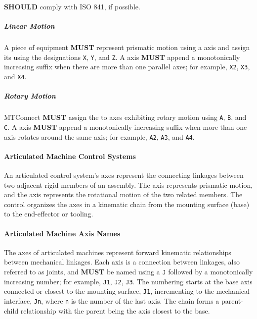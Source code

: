   \textbf{SHOULD} comply with ISO 841, if possible.

\subparagraph{Linear Motion}\mbox{}
\label{sec:Linear Motion}

A piece of equipment \textbf{MUST} represent prismatic motion using a  axis  and assign its  using the designations \texttt{X}, \texttt{Y}, and \texttt{Z}. A  axis  \textbf{MUST} append a monotonically increasing suffix when there are more than one parallel axes; for example, \texttt{X2}, \texttt{X3}, and \texttt{X4}. 

\subparagraph{Rotary Motion}\mbox{}
\label{sec:Rotary Motion}

\gls{MTConnect} \textbf{MUST} assign the  to  axes exhibiting rotary motion using \texttt{A}, \texttt{B}, and \texttt{C}. A  axis  \textbf{MUST} append a monotonically increasing suffix when more than one  axis rotates around the same  axis; for example, \texttt{A2}, \texttt{A3}, and \texttt{A4}. 

\paragraph{Articulated Machine Control Systems}\mbox{}
\label{sec:Articulated Machine Control Systems}

An articulated control system's axes represent the connecting linkages between two adjacent rigid members of an assembly. The  axis represents prismatic motion, and the  axis represents the rotational motion of the two related members. The control organizes the axes in a kinematic chain from the mounting surface (base) to the end-effector or tooling.

\paragraph{Articulated Machine Axis Names}\mbox{}
\label{sec:Articulated Machine Axis Names}

The axes of articulated machines represent forward kinematic relationships between mechanical linkages. Each axis is a connection between linkages, also referred to as joints, and \textbf{MUST} be named using a \texttt{J} followed by a monotonically increasing number; for example, \texttt{J1}, \texttt{J2}, \texttt{J3}.  The numbering starts at the base axis connected or closest to the mounting surface, \texttt{J1}, incrementing to the mechanical interface, \texttt{Jn}, where \texttt{n} is the number of the last axis. The chain forms a parent-child relationship with the parent being the axis closest to the base.

